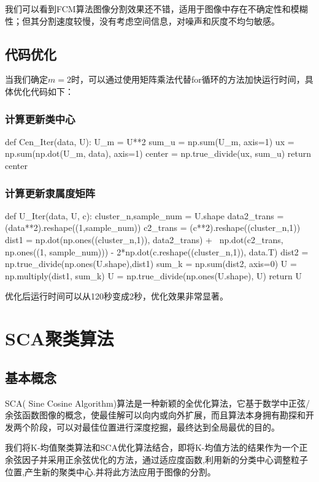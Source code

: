 \documentclass{article}
\begin{document}
我们可以看到FCM算法图像分割效果还不错，适用于图像中存在不确定性和模糊性；但其分割速度较慢，没有考虑空间信息，对噪声和灰度不均匀敏感。

\subsection{代码优化}

当我们确定$m=2$时，可以通过使用矩阵乘法代替for循环的方法加快运行时间，具体优化代码如下：
\subsubsection{计算更新类中心}
\begin{python}
	def Cen_Iter(data, U):
		 U_m = U**2
		 sum_u = np.sum(U_m, axis=1)
		 ux = np.sum(np.dot(U_m, data), axis=1)
		 center = np.true_divide(ux, sum_u)
		 return center
\end{python}

\subsubsection{计算更新隶属度矩阵}
\begin{python}
	def U_Iter(data, U, c):
		 cluster_n,sample_num = U.shape
		 data2_trans = (data**2).reshape((1,sample_num))
		 c2_trans = (c**2).reshape((cluster_n,1))
		 dist1 = np.dot(np.ones((cluster_n,1)), data2_trans) + \
		 	 	 	np.dot(c2_trans, np.ones((1, sample_num))) - 2*np.dot(c.reshape((cluster_n,1)), data.T)
		 dist2 = np.true_divide(np.ones(U.shape),dist1)
		 sum_k = np.sum(dist2, axis=0)
		 U = np.multiply(dist1, sum_k)
		 U = np.true_divide(np.ones(U.shape), U)
		 return U
\end{python}	

优化后运行时间可以从120秒变成2秒，优化效果非常显著。

\section{SCA聚类算法}
\subsection{基本概念}
SCA( Sine Cosine Algorithm)算法是一种新颖的全优化算法，它基于数学中正弦/余弦函数图像的概念，使最佳解可以向内或向外扩展，而且算法本身拥有勘探和开发两个阶段，可以对最佳位置进行深度挖掘，最终达到全局最优的目的。

我们将K-均值聚类算法和SCA优化算法结合，即将K-均值方法的结果作为一个正余弦因子并采用正余弦优化的方法，通过适应度函数,利用新的分类中心调整粒子位置,产生新的聚类中心.并将此方法应用于图像的分割。
\end{document}
